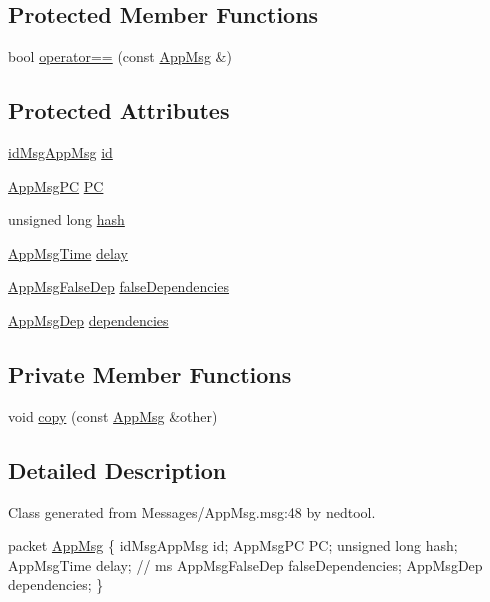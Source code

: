 \subsection*{Protected Member Functions}
\begin{DoxyCompactItemize}
\item 
bool \hyperlink{classAppMsg_a5eb13ac34b1364ca33dbf8f563b9e81c}{operator==} (const \hyperlink{classAppMsg}{App\+Msg} \&)
\end{DoxyCompactItemize}
\subsection*{Protected Attributes}
\begin{DoxyCompactItemize}
\item 
\hyperlink{AppMsg__m_8h_a0bd5e3a5ba85ac1fa0fd0fae34d903c1}{id\+Msg\+App\+Msg} \hyperlink{classAppMsg_aadaa93732c4df84c8b2ef13d7199f9a1}{id}
\item 
\hyperlink{AppMsg__m_8h_abcd76636e4b750d033ffc348601dd7a2}{App\+Msg\+PC} \hyperlink{classAppMsg_a0dceb6642736a90673422df92ab3d788}{PC}
\item 
unsigned long \hyperlink{classAppMsg_a8b73e331d42d97d9e51603dc5352307f}{hash}
\item 
\hyperlink{AppMsg__m_8h_afd955b091e7d9b98cff80a090db1eb09}{App\+Msg\+Time} \hyperlink{classAppMsg_af7a10648a9051ad068c0b2660c7bb545}{delay}
\item 
\hyperlink{AppMsg__m_8h_a2b8cadfd13c916ddccf5a213ca34d8ee}{App\+Msg\+False\+Dep} \hyperlink{classAppMsg_a2e1c93236ae4ceb0fc5571a5b044c454}{false\+Dependencies}
\item 
\hyperlink{AppMsg__m_8h_a39bb58326d7e24febcd7397c022ada6a}{App\+Msg\+Dep} \hyperlink{classAppMsg_a6f78bb134b9a39321ad8093da19d8c8b}{dependencies}
\end{DoxyCompactItemize}
\subsection*{Private Member Functions}
\begin{DoxyCompactItemize}
\item 
void \hyperlink{classAppMsg_a2d5c5dacc13f5e7959467693cd0beda9}{copy} (const \hyperlink{classAppMsg}{App\+Msg} \&other)
\end{DoxyCompactItemize}


\subsection{Detailed Description}
Class generated from {\ttfamily Messages/\+App\+Msg.\+msg\+:48} by nedtool. 
\begin{DoxyPre}
packet \hyperlink{classAppMsg}{AppMsg}
\{
    idMsgAppMsg id;
    AppMsgPC PC;
    unsigned long hash;
    AppMsgTime delay; // ms 
    AppMsgFalseDep falseDependencies;
    AppMsgDep dependencies;
\}
\end{DoxyPre}
 

